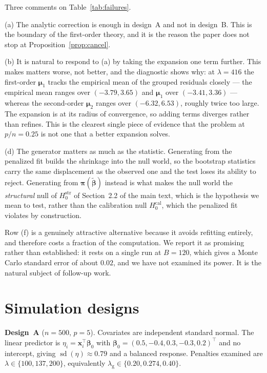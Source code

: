 \documentclass[11pt,a4paper]{article}
\DeclareMathOperator{\sd}{sd}
\newcommand{\bb}{\boldsymbol{\beta}}
\newcommand{\bbt}{\tilde{\boldsymbol{\beta}}}
\newcommand{\bpi}{\boldsymbol{\pi}}
\newcommand{\bmu}{\boldsymbol{\mu}}
\theoremstyle{plain}
\theoremstyle{remark}
\begin{document}
Three comments on Table~\ref{tab:failures}.

(a) The analytic correction is enough in design~A and not in design~B. This is the
boundary of the first-order theory, and it is the reason the paper does not stop at
Proposition~\ref{prop:cancel}.

(b) It is natural to respond to (a) by taking the expansion one term further. This makes
matters worse, not better, and the diagnostic shows why: at $\lambda = 416$ the
first-order $\bmu_1$ tracks the empirical mean of the grouped residuals closely --- the
empirical mean ranges over $(-3.79, 3.65)$ and $\bmu_1$ over $(-3.41, 3.36)$ --- whereas
the second-order $\bmu_2$ ranges over $(-6.32, 6.53)$, roughly twice too large. The
expansion is at its radius of convergence, so adding terms diverges rather than refines.
This is the clearest single piece of evidence that the problem at $p/n = 0.25$ is not one
that a better expansion solves.

(d) The generator matters as much as the statistic. Generating from the penalized fit
builds the shrinkage into the null world, so the bootstrap statistics carry the same
displacement as the observed one and the test loses its ability to reject. Generating
from $\bpi(\bbt)$ instead is what makes the null world the \emph{structural} null of
$H_0^{\mathrm{str}}$ of Section~2.2 of the main text, which is the hypothesis we mean to
test, rather than the calibration null $H_0^{\mathrm{cal}}$, which the penalized fit
violates by construction.

Row (f) is a genuinely attractive alternative because it avoids refitting entirely, and
therefore costs a fraction of the computation. We report it as promising rather than
established: it rests on a single run at $B = 120$, which gives a Monte Carlo standard
error of about $0.02$, and we have not examined its power. It is the natural subject of
follow-up work.


\section{Simulation designs}\label{sec:designs}

\textbf{Design~A} ($n = 500$, $p = 5$). Covariates are independent standard normal. The
linear predictor is $\eta_i = \boldsymbol{x}_i^{\top}\bb_0$ with
$\bb_0 = (0.5, -0.4, 0.3, -0.3, 0.2)^{\top}$ and no intercept, giving
$\sd(\eta) \approx 0.79$ and a balanced response. Penalties examined are
$\lambda \in \{100, 137, 200\}$, equivalently
$\lambda_{\mathrm{g}} \in \{0.20, 0.274, 0.40\}$.
\end{document}

